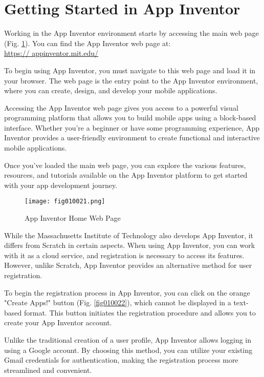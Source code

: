 \section{Getting Started in App Inventor}

Working in the App Inventor environment starts by accessing the main web page (Fig. \ref{fig010021}). You can find the App Inventor web page at: \\ \href{https://appinventor.mit.edu/}{https:// appinventor.mit.edu/}

To begin using App Inventor, you must navigate to this web page and load it in your browser. The web page is the entry point to the App Inventor environment, where you can create, design, and develop your mobile applications.

Accessing the App Inventor web page gives you access to a powerful visual programming platform that allows you to build mobile apps using a block-based interface. Whether you're a beginner or have some programming experience, App Inventor provides a user-friendly environment to create functional and interactive mobile applications.

Once you've loaded the main web page, you can explore the various features, resources, and tutorials available on the App Inventor platform to get started with your app development journey.

\begin{figure}[H]
   \centering
   \texttt{[image: fig010021.png]}
   \caption{App Inventor Home Web Page}
\label{fig010021}
\end{figure}

While the Massachusetts Institute of Technology also develops App Inventor, it differs from Scratch in certain aspects. When using App Inventor, you can work with it as a cloud service, and registration is necessary to access its features. However, unlike Scratch, App Inventor provides an alternative method for user registration.

To begin the registration process in App Inventor, you can click on the orange "Create Apps!" button (Fig. \ref{fig010022}), which cannot be displayed in a text-based format. This button initiates the registration procedure and allows you to create your App Inventor account.

Unlike the traditional creation of a user profile, App Inventor allows logging in using a Google account. By choosing this method, you can utilize your existing Gmail credentials for authentication, making the registration process more streamlined and convenient.

